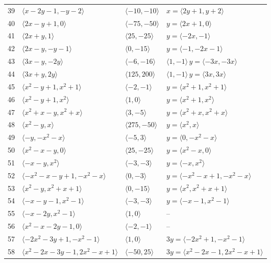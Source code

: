 \documentclass[11pt]{article}
\begin{document}
\begin{longtable}{@{}rlll@{}}
39 & $\langle x-2y-1,-y-2\rangle$ & $\langle -10,-10\rangle$ & $x=\langle 2y+1,y+2\rangle$\\
40 & $\langle 2x-y+1,0\rangle$ & $\langle -75,-50\rangle$ & $y=\langle 2x+1,0\rangle$\\
41 & $\langle 2x+y,1\rangle$ & $\langle 25,-25\rangle$ & $y=\langle -2x,-1\rangle$\\
42 & $\langle 2x-y,-y-1\rangle$ & $\langle 0,-15\rangle$ & $y=\langle -1,-2x-1\rangle$\\
43 & $\langle 3x-y,-2y\rangle$ & $\langle -6,-16\rangle$ & $\langle 1,-1\rangle\,y=\langle -3x,-3x\rangle$\\
44 & $\langle 3x+y,2y\rangle$ & $\langle 125,200\rangle$ & $\langle 1,-1\rangle\,y=\langle 3x,3x\rangle$\\
45 & $\langle x^{2}-y+1,x^{2}+1\rangle$ & $\langle -2,-1\rangle$ & $y=\langle x^{2}+1,x^{2}+1\rangle$\\
46 & $\langle x^{2}-y+1,x^{2}\rangle$ & $\langle 1,0\rangle$ & $y=\langle x^{2}+1,x^{2}\rangle$\\
47 & $\langle x^{2}+x-y,x^{2}+x\rangle$ & $\langle 3,-5\rangle$ & $y=\langle x^{2}+x,x^{2}+x\rangle$\\
48 & $\langle x^{2}-y,x\rangle$ & $\langle 275,-50\rangle$ & $y=\langle x^{2},x\rangle$\\
49 & $\langle -y,-x^{2}-x\rangle$ & $\langle -5,3\rangle$ & $y=\langle 0,-x^{2}-x\rangle$\\
50 & $\langle x^{2}-x-y,0\rangle$ & $\langle 25,-25\rangle$ & $y=\langle x^{2}-x,0\rangle$\\
51 & $\langle -x-y,x^{2}\rangle$ & $\langle -3,-3\rangle$ & $y=\langle -x,x^{2}\rangle$\\
52 & $\langle -x^{2}-x-y+1,-x^{2}-x\rangle$ & $\langle 0,-3\rangle$ & $y=\langle -x^{2}-x+1,-x^{2}-x\rangle$\\
53 & $\langle x^{2}-y,x^{2}+x+1\rangle$ & $\langle 0,-15\rangle$ & $y=\langle x^{2},x^{2}+x+1\rangle$\\
54 & $\langle -x-y-1,x^{2}-1\rangle$ & $\langle -3,-3\rangle$ & $y=\langle -x-1,x^{2}-1\rangle$\\
55 & $\langle -x-2y,x^{2}-1\rangle$ & $\langle 1,0\rangle$ & --\\
56 & $\langle x^{2}-x-2y-1,0\rangle$ & $\langle -2,-1\rangle$ & --\\
57 & $\langle -2x^{2}-3y+1,-x^{2}-1\rangle$ & $\langle 1,0\rangle$ & $3y=\langle -2x^{2}+1,-x^{2}-1\rangle$\\
58 & $\langle x^{2}-2x-3y-1,2x^{2}-x+1\rangle$ & $\langle -50,25\rangle$ & $3y=\langle x^{2}-2x-1,2x^{2}-x+1\rangle$\\
\end{longtable}
\endgroup
\end{document}
